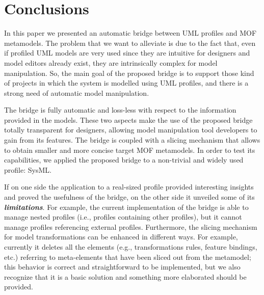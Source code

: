 \section{Conclusions}\label{sec:conclusion}
In this paper we presented an automatic bridge between UML profiles and MOF metamodels.
The problem that we want to alleviate is due to the fact that, even if profiled UML models are very used since they are intuitive for designers and model editors already exist, 
they are intrinsically complex for model manipulation.
So, the main goal of the proposed bridge is to support those kind of projects in which the system is modelled using UML profiles, and there is a strong need of automatic model manipulation.

The bridge is fully automatic and
loss-less with respect to the information provided in the models. 
These two aspects make the use of the proposed bridge totally transparent for designers, allowing
model manipulation tool developers to gain from its features. The bridge is coupled with a slicing mechanism
that allows to obtain smaller and more concise target MOF metamodels.
In order to test its capabilities, we applied the proposed bridge to a non-trivial and widely used profile:
SysML. 

If on one side the application to a real-sized profile provided interesting insights and proved the usefulness of the bridge, on the other side it unveiled some of its \textbf{\textit{limitations}}.
For example, the current implementation of the bridge is able to manage nested profiles (i.e., profiles containing other profiles), but it
cannot manage profiles referencing external profiles.
Furthermore, the slicing mechanism for model transformations can be enhanced in different ways. For example, currently it deletes all the
elements (e.g., transformations rules, feature bindings, etc.) referring to meta-elements that have been sliced out from the metamodel;
this behavior is correct and straightforward to be implemented, but we also recognize that it is a basic solution 
and something more elaborated should be provided.

